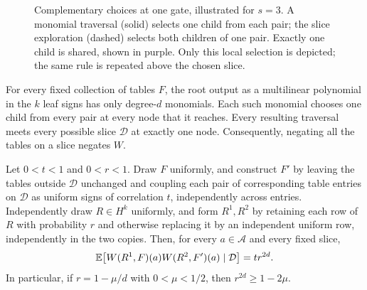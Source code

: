 \begin{figure}[ht]
\centering

\caption{Complementary choices at one gate, illustrated for $s=3$.
A monomial traversal (solid) selects one child from each pair; the slice
exploration (dashed) selects both children of one pair. Exactly one child
is shared, shown in purple. Only this local selection is depicted;
the same rule is repeated above the chosen slice.}
\label{fig:traversals}
\end{figure}

\begin{lemma}
\label{lem:tree-correlation}
For every fixed collection of tables $F$, the root output as a
multilinear polynomial in the $k$ leaf signs has only degree-$d$
monomials.  Each such monomial chooses one child from every pair
at every node that it reaches.  Every resulting traversal meets
every possible slice $\mathcal D$ at exactly one node.
Consequently, negating all the tables on a slice negates $W$.

Let $0<t<1$ and $0<r<1$.  Draw $F$ uniformly, and construct $F'$
by leaving the tables outside $\mathcal D$ unchanged and coupling
each pair of corresponding table entries on $\mathcal D$ as
uniform signs of correlation $t$, independently across entries.
Independently draw
$R\in H^k$ uniformly, and form $R^1,R^2$ by retaining each row of
$R$ with probability $r$ and otherwise replacing it by an
independent uniform row, independently in the two copies.
Then, for every $a\in\mathcal A$ and every fixed slice,
\begin{equation}
 \mathbb E\bigl[W(R^1,F)(a)W(R^2,F')(a)\mid\mathcal D\bigr]
       =t r^{2d}.
 \label{eq:tree-correlation}
\end{equation}
In particular, if $r=1-\mu/d$ with $0<\mu<1/2$, then
$r^{2d}\ge1-2\mu$.
\end{lemma}

